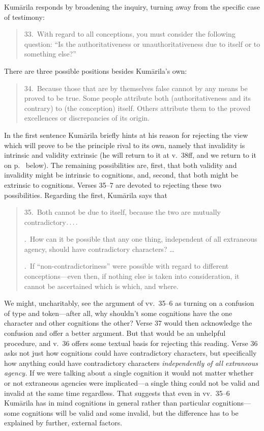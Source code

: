 \documentclass[11pt,letterpaper,oneside]{amsart}
\newcommand{\sdots}{$\ldotp\ldotp\ldotp\ldotp$\ }
\newenvironment{squote}{\begin{quote}\sf\small}{\rm\end{quote}} %
\begin{document}
Kum\=arila responds by broadening the inquiry, turning away from the specific case of testimony: \begin{squote}33.\ With regard to all conceptions, you must consider the following question: ``Is the authoritativeness or unauthoritativeness due to itself or to something else?''\end{squote} There are three possible positions besides Kum\=arila's own:\begin{squote}34.\ Because those that are by themselves false cannot by any means be proved to be true. Some people attribute both (authoritativeness and its contrary) to (the conception) itself. Others attribute them to the proved excellences or discrepancies of its origin.\end{squote} In the first sentence Kum\=arila briefly hints at his reason for rejecting the view which will prove to be the principle rival to its own, namely that invalidity is intrinsic and validity extrinsic (he will return to it at v.\ 38ff, and we return to it on p.\ \pageref{rival} below). The remaining possibilities are, first, that both validity and invalidity might be intrinsic to cognitions, and, second, that both might be extrinsic to cognitions. Verses 35--7 are devoted to rejecting these two possibilities. Regarding the first, Kum\=arila says that \begin{squote}35.\ Both cannot be due to itself, because the two are mutually contradictory\sdots

.\ How can it be possible that any one thing, independent of all extraneous agency, should have contradictory characters? \ldots

.\ If ``non-contradictoriness'' were possible with regard to different conceptions---even then, if nothing else is taken into consideration, it cannot be ascertained which is which, and where.\end{squote} We might, uncharitably, see the argument of vv.\ 35--6 as turning on a confusion of type and token---after all, why shouldn't some cognitions have the one character and other cognitions the other? Verse 37 would then acknowledge the confusion and offer a better argument. But that would be an unhelpful procedure, and v.\ 36 offers some textual basis for rejecting this reading. Verse 36 asks not just how cognitions could have contradictory characters, but specifically how anything could have contradictory characters \emph{independently of all extraneous agency.} If we were talking about a single cognition it would not matter whether or not extraneous agencies were implicated---a single thing could not be valid and invalid at the same time regardless. That suggests that even in vv.\ 35--6 Kum\=arila has in mind cognitions in general rather than particular cognitions---some cognitions will be valid and some invalid, but the difference has to be explained by further, external factors.
\end{document}
